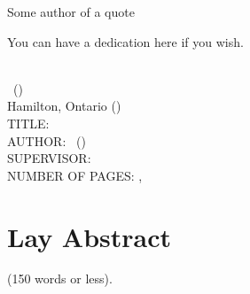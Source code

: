 \documentclass[
11pt, %
oneside, %
english, %
singlespacing, %
]{macthesis} %
\def\blankpage{%
      \clearpage%
      \thispagestyle{empty}%
      \addtocounter{page}{-1}%
      \null%
      \clearpage}
\begin{document}
\hfill\textemdash Some author of a quote

\blankpage
\clearpage



    You can have a dedication here if you wish.

\blankpage
\clearpage


\newpage
{} %
\setcounter{page}{2} %

\noindent %
\univname \\
\degreename\, (\the\year) \\
Hamilton, Ontario (\deptname) \\[1.5cm]
TITLE: \ttitle \\
AUTHOR: \authorname\,  %
(\univname)  \\
SUPERVISOR: \supname\, \\
NUMBER OF PAGES: \pageref{lastoffront}, \pageref{LastPage}  %

\clearpage

\section*{Lay Abstract}
  (150 words or less).
\end{document}
